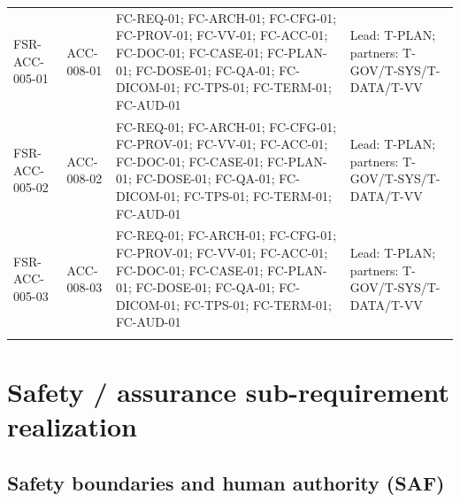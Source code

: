 \documentclass[11pt,letterpaper]{article}
\begin{document}
\begin{scriptsize}
\begin{longtable}{@{}L{0.16\textwidth}L{0.12\textwidth}L{0.49\textwidth}L{0.17\textwidth}@{}}
\addlinespace[2pt]
\mbox{FSR-ACC-005-01} & \mbox{ACC-008-01} & FC-REQ-01; FC-ARCH-01; FC-CFG-01; FC-PROV-01; FC-VV-01; FC-ACC-01; FC-DOC-01; FC-CASE-01; FC-PLAN-01; FC-DOSE-01; FC-QA-01; FC-DICOM-01; FC-TPS-01; FC-TERM-01; FC-AUD-01 & Lead: T-PLAN; partners: T-GOV\slash\allowbreak{}T-SYS\slash\allowbreak{}T-DATA\slash\allowbreak{}T-VV \\
\addlinespace[2pt]
\mbox{FSR-ACC-005-02} & \mbox{ACC-008-02} & FC-REQ-01; FC-ARCH-01; FC-CFG-01; FC-PROV-01; FC-VV-01; FC-ACC-01; FC-DOC-01; FC-CASE-01; FC-PLAN-01; FC-DOSE-01; FC-QA-01; FC-DICOM-01; FC-TPS-01; FC-TERM-01; FC-AUD-01 & Lead: T-PLAN; partners: T-GOV\slash\allowbreak{}T-SYS\slash\allowbreak{}T-DATA\slash\allowbreak{}T-VV \\
\addlinespace[2pt]
\mbox{FSR-ACC-005-03} & \mbox{ACC-008-03} & FC-REQ-01; FC-ARCH-01; FC-CFG-01; FC-PROV-01; FC-VV-01; FC-ACC-01; FC-DOC-01; FC-CASE-01; FC-PLAN-01; FC-DOSE-01; FC-QA-01; FC-DICOM-01; FC-TPS-01; FC-TERM-01; FC-AUD-01 & Lead: T-PLAN; partners: T-GOV\slash\allowbreak{}T-SYS\slash\allowbreak{}T-DATA\slash\allowbreak{}T-VV \\
\addlinespace[2pt]
\end{longtable}
\end{scriptsize}

\section{Safety / assurance sub-requirement realization}

\subsection{Safety boundaries and human authority (SAF)}
\end{document}
